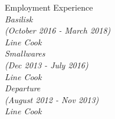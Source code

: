 \documentclass{article}
\newcommand\leftcolwidthvar{0.35}
\begin{document}
{\begin{minipage}[t]{\leftcolwidthvar \textwidth}
\begin{flushleft}
{{}}	
\end{flushleft}
\vspace{0.5ex}
%
%
\begin{flushleft}
	\textsf{\Large Employment Experience}\\
	\smallskip
	\textsf{\textit{%
			Basilisk \\(October 2016 - March 2018)\\ Line Cook\\\vspace{2pt}
			Smallwares \\(Dec 2013 - July 2016)\\ Line Cook\\\vspace{2pt}
			Departure \\(August 2012 - Nov 2013)\\ Line Cook\\\vspace{2pt}}}
\end{flushleft}
\end{minipage}}
\hfill
%
%
\end{document}
